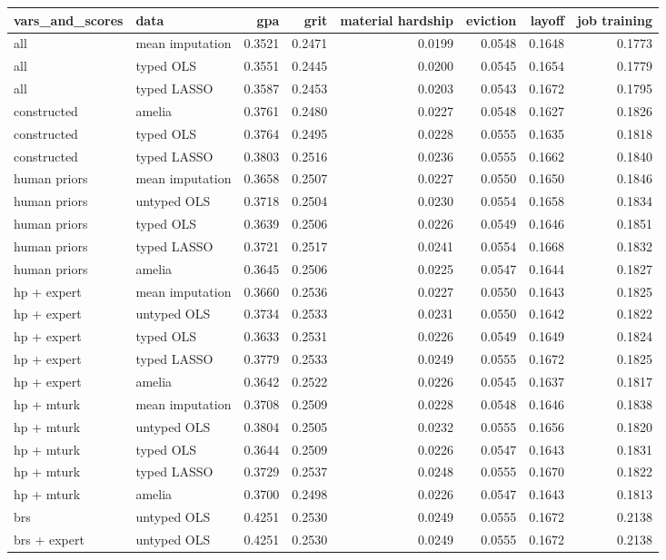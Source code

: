
\begin{tabular}{l|l|r|r|r|r|r|r}
\hline
vars\_and\_scores & data & gpa & grit & material hardship & eviction & layoff & job training\\
\hline
all & mean imputation & 0.3521 & 0.2471 & 0.0199 & 0.0548 & 0.1648 & 0.1773\\
\hline
all & typed OLS & 0.3551 & 0.2445 & 0.0200 & 0.0545 & 0.1654 & 0.1779\\
\hline
all & typed LASSO & 0.3587 & 0.2453 & 0.0203 & 0.0543 & 0.1672 & 0.1795\\
\hline
constructed & amelia & 0.3761 & 0.2480 & 0.0227 & 0.0548 & 0.1627 & 0.1826\\
\hline
constructed & typed OLS & 0.3764 & 0.2495 & 0.0228 & 0.0555 & 0.1635 & 0.1818\\
\hline
constructed & typed LASSO & 0.3803 & 0.2516 & 0.0236 & 0.0555 & 0.1662 & 0.1840\\
\hline
human priors & mean imputation & 0.3658 & 0.2507 & 0.0227 & 0.0550 & 0.1650 & 0.1846\\
\hline
human priors & untyped OLS & 0.3718 & 0.2504 & 0.0230 & 0.0554 & 0.1658 & 0.1834\\
\hline
human priors & typed OLS & 0.3639 & 0.2506 & 0.0226 & 0.0549 & 0.1646 & 0.1851\\
\hline
human priors & typed LASSO & 0.3721 & 0.2517 & 0.0241 & 0.0554 & 0.1668 & 0.1832\\
\hline
human priors & amelia & 0.3645 & 0.2506 & 0.0225 & 0.0547 & 0.1644 & 0.1827\\
\hline
hp + expert & mean imputation & 0.3660 & 0.2536 & 0.0227 & 0.0550 & 0.1643 & 0.1825\\
\hline
hp + expert & untyped OLS & 0.3734 & 0.2533 & 0.0231 & 0.0550 & 0.1642 & 0.1822\\
\hline
hp + expert & typed OLS & 0.3633 & 0.2531 & 0.0226 & 0.0549 & 0.1649 & 0.1824\\
\hline
hp + expert & typed LASSO & 0.3779 & 0.2533 & 0.0249 & 0.0555 & 0.1672 & 0.1825\\
\hline
hp + expert & amelia & 0.3642 & 0.2522 & 0.0226 & 0.0545 & 0.1637 & 0.1817\\
\hline
hp + mturk & mean imputation & 0.3708 & 0.2509 & 0.0228 & 0.0548 & 0.1646 & 0.1838\\
\hline
hp + mturk & untyped OLS & 0.3804 & 0.2505 & 0.0232 & 0.0555 & 0.1656 & 0.1820\\
\hline
hp + mturk & typed OLS & 0.3644 & 0.2509 & 0.0226 & 0.0547 & 0.1643 & 0.1831\\
\hline
hp + mturk & typed LASSO & 0.3729 & 0.2537 & 0.0248 & 0.0555 & 0.1670 & 0.1822\\
\hline
hp + mturk & amelia & 0.3700 & 0.2498 & 0.0226 & 0.0547 & 0.1643 & 0.1813\\
\hline
brs & untyped OLS & 0.4251 & 0.2530 & 0.0249 & 0.0555 & 0.1672 & 0.2138\\
\hline
brs + expert & untyped OLS & 0.4251 & 0.2530 & 0.0249 & 0.0555 & 0.1672 & 0.2138\\
\hline
\end{tabular}
